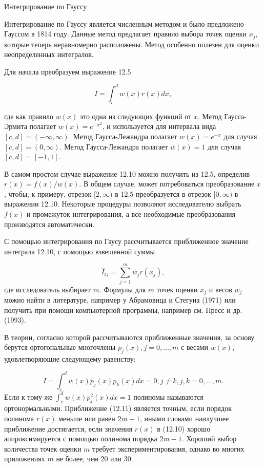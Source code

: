 \begin{center}
Интегрирование по Гауссу
\end{center}

Интегрирование по Гауссу является численным методом и было предложено Гауссом в 1814 году. Данные метод предлагает правило выбора точек оценки $x_j$, которые теперь неравномерно расположены. Метод особенно полезен для оценки неопределенных интегралов. 

Для начала преобразуем выражение 12.5 

\begin{equation}
I=\int^{d}_{c}w(x)r(x)dx,
\end{equation}

где как правило $w(x)$ это одна из следующих функций от $x$. Метод Гаусса-Эрмита полагает  $w(x)=e^{-x^2}$, и используется для интервала вида $[c,d]=(-\infty,\infty)$. Метод Гаусса-Лежандра полагает  $w(x)=e^{-x}$ для случая $[c,d]=(0,\infty)$. Метод Гаусса-Лежандра полагает $w(x)=1$ для случая $[c,d]=[-1,1]$.

В самом простом случае выражение 12.10 можно получить из 12.5, определив $r(x)=f(x)/w(x)$. В общем случае, может потребоваться преобразование $x$, чтобы, к примеру, отрезок $[2,\infty)$ в 12.5 преобразуется в отрезок $[0,\infty)$ в выражении 12.10. Некоторые процедуры позволяют исследователю выбрать $f(x)$ и промежуток интегрирования, а все необходимые преобразования производятся автоматически.

С помощью интегрирования по Гаусу рассчитывается приближенное значение интеграла 12.10, с помощью взвешенной суммы

\begin{equation}
\hat{I}_{G}=\sum^{m}_{j=1}w_{j}r(x_j),
\end{equation}
где исследователь выбирает $m$. Формулы для $m$ точек оценки $x_j$ и весов $w_j$ можно найти в литературе, например у  Абрамовица и Стегуна (1971) или получить при помощи компьютерной программы, например см. Пресс и др. (1993).

В теории, согласно которой рассчитываются приближенные значения, за основу берутся ортогональные многочлены $p_j(x), j=0,\ldots ,m$ с весами $w(x)$, удовлетворяющие следующему равенству:

\[
I=\int^{d}_{c}w(x)p_{j}(x)p_{k}(x)dx=0, j{\neq}k, j,k=0,\ldots ,m.
\] 
Если к тому же $\int^{d}_{c}w(x)p^{2}_{j}(x)dx=1$ полиномы называются ортонормальными. Приближение (12.11) является точным, если порядок полинома $r(x)$ меньше или равен $2m-1$, иными словами наилучшее приближение достигается, если значения $r(x)$ в (12.10) хорошо аппроксимируется с помощью полинома порядка $2m-1$. Хороший выбор количества точек оценки $m$ требует экспериментирования, однако во многих приложениях $m$ не более, чем 20 или 30.

